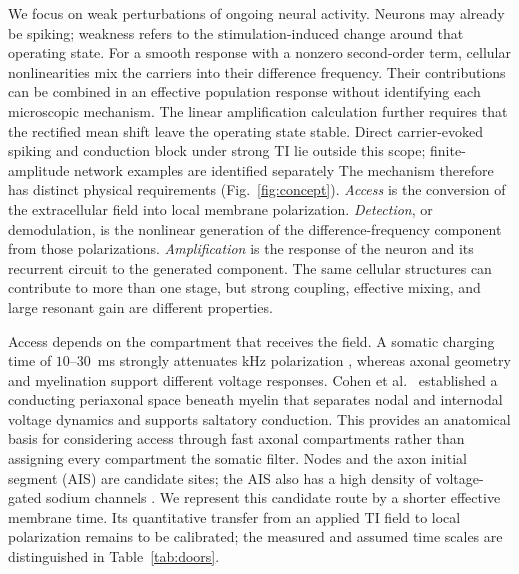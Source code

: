 \documentclass[11pt,a4paper]{article}
\providecommand{\DIFaddtex}[1]{{\protect\color{blue} \sf #1}} %
\providecommand{\DIFdeltex}[1]{{\protect\color{red} \scriptsize #1}} %
\providecommand{\DIFaddbegin}{} %
\providecommand{\DIFaddend}{} %
\providecommand{\DIFdelbegin}{} %
\providecommand{\DIFdelend}{} %
\providecommand{\DIFadd}[1]{\texorpdfstring{\DIFaddtex{#1}}{#1}} %
\providecommand{\DIFdel}[1]{\texorpdfstring{\DIFdeltex{#1}}{}} %
\begin{document}
\DIFdelbegin \DIFdel{We focus on weak perturbations of ongoing neural activity. Neurons may already be
spiking; weakness refers to the stimulation-induced change around that operating state. For a smooth response with a nonzero second-order term, cellular nonlinearities mix the carriers into their difference frequency.
Their contributions can be combined in an
effective population response without identifying each microscopic mechanism.
The
linear amplification calculation further requires that the rectified mean shift leave
the operating state stable. Direct carrier-evoked spiking and conduction block under
strong TI lie outside this scope; finite-amplitude network examples are identified
separately}\DIFdelend \DIFaddbegin \DIFadd{The mechanism therefore has distinct physical requirements (Fig.~\ref{fig:concept}).
\emph{Access} is the conversion of the extracellular field into local membrane
polarization. \emph{Detection}, or demodulation, is the nonlinear generation of the
difference-frequency component from those polarizations. \emph{Amplification} is
the response of the neuron and its recurrent circuit to the generated component.
The same cellular structures can contribute to more than one stage, but strong
coupling, effective mixing, and large resonant gain are different properties.
}

\DIFadd{Access depends on the compartment that receives the field. A somatic charging time
of $10$--$30$~ms strongly attenuates kHz polarization \cite{deitcher2017,eyal2016},
whereas axonal geometry and myelination support different voltage responses.
Cohen et al.\ \cite{cohen2020periaxonal} established a conducting periaxonal space
beneath myelin that separates nodal and internodal voltage dynamics and supports
saltatory conduction. This provides an anatomical basis for considering access
through fast axonal compartments rather than assigning every compartment the
somatic filter. Nodes and the axon initial segment (AIS) are candidate sites; the
AIS also has a high density of voltage-gated sodium channels \cite{kole2008ais}.
We represent this candidate route by a shorter effective membrane time. Its
quantitative transfer from an applied TI field to local polarization remains to
be calibrated; the measured and assumed time scales are distinguished in
Table~\ref{tab:doors}}\DIFaddend .
\end{document}
